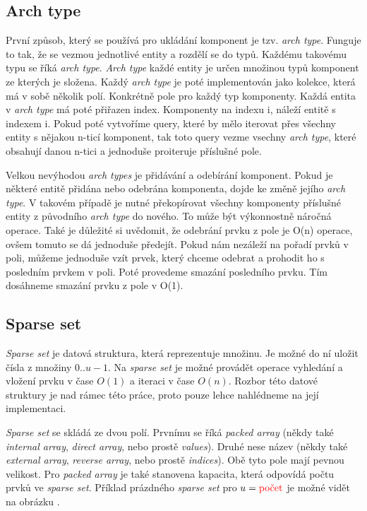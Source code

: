 \subsection{Arch type}

První způsob, který se používá pro ukládání komponent je tzv. \textit{arch type}. Funguje to tak, že se vezmou jednotlivé entity a rozdělí se do typů. Každému takovému typu se říká \textit{arch type}. \textit{Arch type} každé entity je určen množinou typů komponent ze kterých je složena. Každý \textit{arch type} je poté implementován jako kolekce, která má v sobě několik polí. Konkrétně pole pro každý typ komponenty. Každá entita v \textit{arch type} má poté přiřazen index. Komponenty na indexu i, náleží entitě s indexem i. Pokud poté vytvoříme query, které by mělo iterovat přes všechny entity s nějakou n-ticí komponent, tak toto query vezme vsechny \textit{arch type}, které obsahují danou n-tici a jednoduše proiteruje příslušné pole.


Velkou nevýhodou \textit{arch types} je přidávání a odebírání komponent. Pokud je některé entitě přidána nebo odebrána komponenta, dojde ke změně jejího \textit{arch type}. V takovém případě je nutné překopírovat všechny komponenty příslušné entity z původního \textit{arch type} do nového. To může být výkonnostně náročná operace. Také je důležité si uvědomit, že odebrání prvku z pole je O(n) operace, ovšem tomuto se dá jednoduše předejít. Pokud nám nezáleží na pořadí prvků v poli, můžeme jednoduše vzít prvek, který chceme odebrat a prohodit ho s posledním prvkem v poli. Poté provedeme smazání posledního prvku. Tím dosáhneme smazání prvku z pole v O(1).

\subsection{Sparse set}


\textit{Sparse set} je datová struktura, která reprezentuje množinu. Je možné do ní uložit čísla z množiny $0..u-1$. Na \textit{sparse set} je možné provádět operace vyhledání a vložení prvku v čase $O(1)$ a iteraci v čase $O(n)$. Rozbor této datové struktury je nad rámec této práce, proto pouze lehce nahlédneme na její implementaci.

\textit{Sparse set} se skládá ze dvou polí. Prvnímu se říká \textit{packed array} (někdy také \textit{internal array}, \textit{direct array}, nebo prostě \textit{values}). Druhé nese název  (někdy také \textit{external array}, \textit{reverse array}, nebo prostě \textit{indices}). Obě tyto pole mají pevnou velikost. Pro \textit{packed array} je také stanovena kapacita, která odpovídá počtu prvků ve \textit{sparse set}. Příklad prázdného \textit{sparse set} pro $u=\text{\xxx{počet}}$ je možné vidět na obrázku . 

